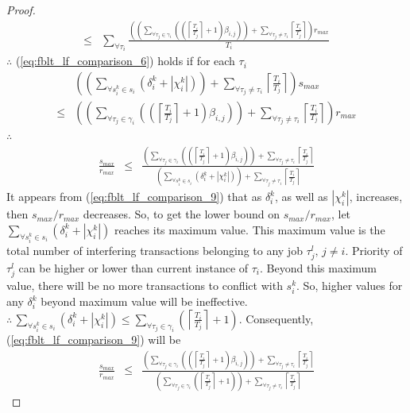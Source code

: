 \documentclass[a4paper,english]{article}
\newtheorem{proof}{Proof}
\begin{document}
\begin{proof}
\begin{eqnarray}
\le & \sum_{\forall\tau_{i}}\frac{\left(\left(\sum_{\forall\tau_{j}\in\gamma_{i}}\left(\left(\left\lceil \frac{T_{i}}{T_{j}}\right\rceil +1\right)\beta_{i,j}\right)\right)+\sum_{\forall\tau_{j}\neq\tau_{i}}\left\lceil \frac{T_{i}}{T_{j}}\right\rceil \right)r_{max}}{T_{i}}\nonumber 
\end{eqnarray}
$\therefore$ (\ref{eq:fblt_lf_comparison_6}) holds if for each $\tau_{i}$
\begin{eqnarray}
 & \left(\left(\sum_{\forall s_{i}^{k}\in s_{i}}\left(\delta_{i}^{k}+|\chi_{i}^{k}|\right)\right)+\sum_{\forall\tau_{j}\neq\tau_{i}}\left\lceil \frac{T_{i}}{T_{j}}\right\rceil \right)s_{max}\label{eq:fblt_lf_comparison_7}\\
\le & \left(\left(\sum_{\forall\tau_{j}\in\gamma_{i}}\left(\left(\left\lceil \frac{T_{i}}{T_{j}}\right\rceil +1\right)\beta_{i,j}\right)\right)+\sum_{\forall\tau_{j}\neq\tau_{i}}\left\lceil \frac{T_{i}}{T_{j}}\right\rceil \right)r_{max}\nonumber 
\end{eqnarray}
$\therefore$
\begin{eqnarray}
\frac{s_{max}}{r_{max}} & \le & \frac{\left(\sum_{\forall\tau_{j}\in\gamma_{i}}\left(\left(\left\lceil \frac{T_{i}}{T_{j}}\right\rceil +1\right)\beta_{i,j}\right)\right)+\sum_{\forall\tau_{j}\neq\tau_{i}}\left\lceil \frac{T_{i}}{T_{j}}\right\rceil }{\left(\sum_{\forall s_{i}^{k}\in s_{i}}\left(\delta_{i}^{k}+|\chi_{i}^{k}|\right)\right)+\sum_{\forall\tau_{j}\neq\tau_{i}}\left\lceil \frac{T_{i}}{T_{j}}\right\rceil }\label{eq:fblt_lf_comparison_9}
\end{eqnarray}
It appears from (\ref{eq:fblt_lf_comparison_9}) that as $\delta_{i}^{k}$,
as well as $|\chi_{i}^{k}|$, increases, then $s_{max}/r_{max}$ decreases.
So, to get the lower bound on $s_{max}/r_{max}$, let $\sum_{\forall s_{i}^{k}\in s_{i}}\left(\delta_{i}^{k}+|\chi_{i}^{k}|\right)$
reaches its maximum value. This maximum value is the total number
of interfering transactions belonging to any job $\tau_{j}^{l},\, j\ne i$.
Priority of $\tau_{j}^{l}$ can be higher or lower than current instance
of $\tau_{i}$. Beyond this maximum value, there will be no more transactions
to conflict with $s_{i}^{k}$. So, higher values for any $\delta_{i}^{k}$
beyond maximum value will be ineffective. $\therefore\,\sum_{\forall s_{i}^{k}\in s_{i}}\left(\delta_{i}^{k}+|\chi_{i}^{k}|\right)\le\sum_{\forall\tau_{j}\in\gamma_{i}}\left(\left\lceil \frac{T_{i}}{T_{j}}\right\rceil +1\right)$.
Consequently, (\ref{eq:fblt_lf_comparison_9}) will be 
\begin{eqnarray}
\frac{s_{max}}{r_{max}} & \le & \frac{\left(\sum_{\forall\tau_{j}\in\gamma_{i}}\left(\left(\left\lceil \frac{T_{i}}{T_{j}}\right\rceil +1\right)\beta_{i,j}\right)\right)+\sum_{\forall\tau_{j}\neq\tau_{i}}\left\lceil \frac{T_{i}}{T_{j}}\right\rceil }{\left(\sum_{\forall\tau_{j}\in\gamma_{i}}\left(\left\lceil \frac{T_{i}}{T_{j}}\right\rceil +1\right)\right)+\sum_{\forall\tau_{j}\neq\tau_{i}}\left\lceil \frac{T_{i}}{T_{j}}\right\rceil }\label{eq:fblt_lf_comparison_10}

\end{eqnarray}
\end{proof}
\end{document}
